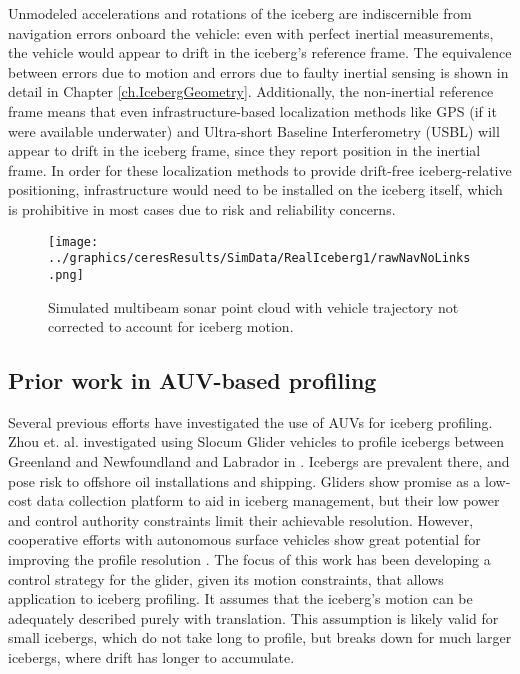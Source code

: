 Unmodeled accelerations and rotations of the iceberg are indiscernible from navigation errors onboard the vehicle: even with perfect inertial measurements, the vehicle would appear to drift in the iceberg's reference frame. The equivalence between errors due to motion and errors due to faulty inertial sensing is shown in detail in Chapter \ref{ch.IcebergGeometry}. Additionally, the non-inertial reference frame means that even infrastructure-based localization methods like GPS (if it were available underwater) and Ultra-short Baseline Interferometry (USBL) will appear to drift in the iceberg frame, since they report position in the inertial frame. In order for these localization methods to provide drift-free iceberg-relative positioning, infrastructure would need to be installed on the iceberg itself, which is prohibitive in most cases due to risk and reliability concerns.

\begin{figure}[!htb]
   \centering
   \texttt{[image: ../graphics/ceresResults/SimData/RealIceberg1/rawNavNoLinks.png]} %
   \caption{Simulated multibeam sonar point cloud with vehicle trajectory not corrected to account for iceberg motion.}
   \label{fig:Challenge}
\end{figure}

\subsection{Prior work in AUV-based profiling}

Several previous efforts have investigated the use of AUVs for iceberg profiling. 
Zhou et. al. investigated using Slocum Glider vehicles to profile icebergs between Greenland and Newfoundland and Labrador in \cite{Zhou2014}. Icebergs are prevalent there, and pose risk to offshore oil installations and shipping. Gliders show promise as a low-cost data collection platform to aid in iceberg management, but their low power and control authority constraints limit their achievable resolution. However, cooperative efforts with autonomous surface vehicles show great potential for improving the profile resolution \cite{Smith2014}. The focus of this work has been developing a control strategy for the glider, given its motion constraints, that allows application to iceberg profiling. It assumes that the iceberg's motion can be adequately described purely with translation. This assumption is likely valid for small icebergs, which do not take long to profile, but breaks down for much larger icebergs, where drift has longer to accumulate. 

